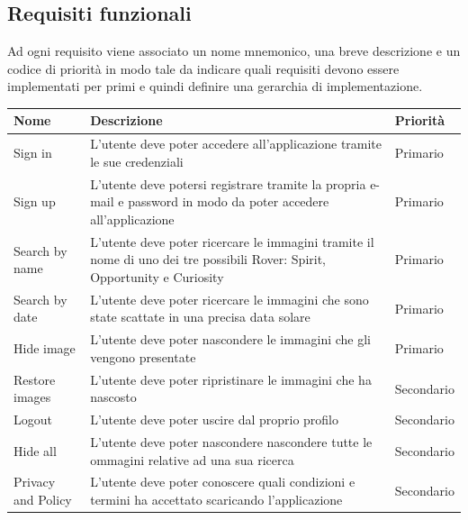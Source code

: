 \subsection{Requisiti funzionali}

Ad ogni requisito viene associato un nome mnemonico, una breve descrizione e un codice di priorit\`a in modo tale da indicare quali requisiti devono essere implementati per primi e quindi definire una gerarchia di implementazione.
\begin{center}
    \begin{longtable}{ | l | p{7cm} | l | }
        \hline
        \textbf{Nome}      & \textbf{Descrizione }                                                                                                     & \textbf{Priorit\`a} \\ \hline
        Sign in            & L'utente deve poter accedere all'applicazione tramite le sue credenziali                                                  & Primario            \\ \hline
        Sign up            & L'utente deve potersi registrare tramite la propria e-mail e password in modo da poter accedere all'applicazione          & Primario            \\ \hline
        Search by name     & L'utente deve poter ricercare le immagini tramite il nome di uno dei tre possibili Rover: Spirit, Opportunity e Curiosity & Primario            \\ \hline
        Search by date     & L'utente deve poter ricercare le immagini che sono state scattate in una precisa data solare                              & Primario            \\ \hline
        Hide image         & L'utente deve poter nascondere le immagini che gli vengono presentate                                                     & Primario            \\ \hline
        Restore images     & L'utente deve poter ripristinare le immagini che ha nascosto                                                              & Secondario          \\ \hline
        Logout             & L'utente deve poter uscire dal proprio profilo                                                                            & Secondario          \\ \hline
        Hide all           & L'utente deve poter nascondere nascondere tutte le ommagini relative ad una sua ricerca                                   & Secondario          \\ \hline
        Privacy and Policy & L'utente deve poter conoscere quali condizioni e termini ha accettato scaricando l'applicazione                           & Secondario          \\ \hline
    \end{longtable}
\end{center}
